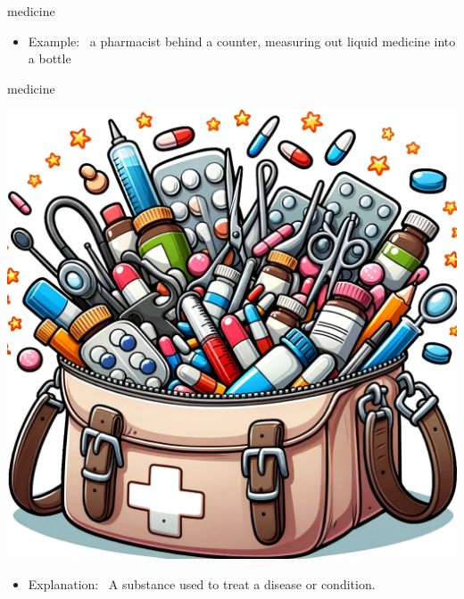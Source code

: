 \documentclass[avery5371, grid,frame]{flashcards}
\begin{document}
\begin{flashcard}{medicine}
\begin{center}
\begin{minipage}[c]{.45\textwidth}
\begin{itemize}
            \item Example: \ a pharmacist behind a counter, measuring out liquid medicine into a bottle
            \end{itemize}
        \end{minipage}
    \end{center}
    \vspace*{\fill}
\end{flashcard}\begin{flashcard}{medicine}
    \vspace*{\fill}
    \begin{center}
        \begin{minipage}[c]{.45\textwidth}
            \includegraphics[width=\textwidth]{cards/m/medicine/medicine - a medical bag overflowing with various medical tools and bottles of pills.png}
        \end{minipage}
        \begin{minipage}[c]{.45\textwidth}
            \begin{itemize}\setlength\itemsep{12pt}
            \item Explanation: \ A substance used to treat a disease or condition.


\end{itemize}
\end{minipage}
\end{center}
\end{flashcard}
\end{document}
